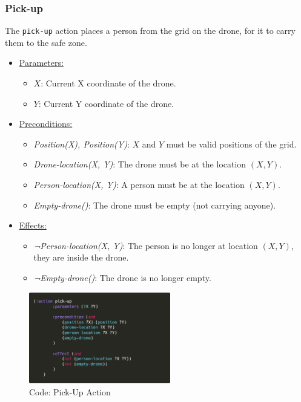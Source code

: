 \documentclass{article}
\begin{document}
\subsubsection{Pick-up}
The \texttt{pick-up} action places a person from the grid on the drone, for it to carry them to the safe zone.

\newpage
\begin{itemize}
    \item \underline{Parameters:}
    \begin{itemize}
        \item $X$: Current X coordinate of the drone.
        \item $Y$: Current Y coordinate of the drone.
    \end{itemize}
    \item \underline{Preconditions:}
    \begin{itemize}
        \item \textit{Position(X), Position(Y)}: $X$ and $Y$ must be valid positions of the grid.
        \item \textit{Drone-location(X, Y)}: The drone must be at the location $(X, Y)$.
        \item \textit{Person-location(X, Y)}: A person must be at the location $(X, Y)$.
        \item \textit{Empty-drone()}: The drone must be empty (not carrying anyone).
    \end{itemize}
    \item \underline{Effects:}
    \begin{itemize}
        \item \textit{¬Person-location(X, Y)}: The person is no longer at location $(X, Y)$, they are inside the drone.
        \item \textit{¬Empty-drone()}: The drone is no longer empty.
    \end{itemize}
\end{itemize}
\begin{figure}[ht]
    \centering
    \includegraphics[width=0.55\textwidth]{assets/solution_coordinates/pick-up.png}
    \caption{Code: Pick-Up Action}
    \label{fig:act:pick-up}
\end{figure}
\end{document}
